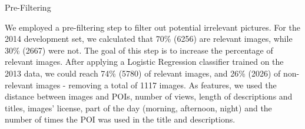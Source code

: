 

\begin{subsection}{Pre-Filtering}

We employed a pre-filtering step to filter out potential irrelevant pictures.
For the 2014 development set, we calculated that 70\% (6256) are relevant images, while 30\% (2667) were not.
The goal of this step is to increase the percentage of relevant images. 
After applying a Logistic Regression classifier trained on the 2013 data, we could reach 74\% (5780) of relevant images, and 26\% (2026) of non-relevant images - removing a total of 1117 images. As features, we used the distance between images and POIs, number of views, length of descriptions and titles, images' license, part of the day (morning, afternoon, night) and the number of times the POI was used in the title and descriptions.



\end{subsection}


